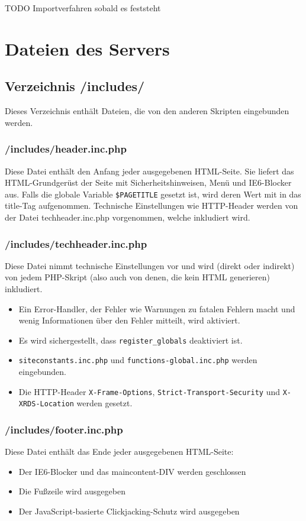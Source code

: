 TODO Importverfahren sobald es feststeht

\newpage
\section{Dateien des Servers}

\subsection{Verzeichnis /includes/}
Dieses Verzeichnis enthält Dateien, die von den anderen Skripten eingebunden werden.

\subsubsection{/includes/header.inc.php}
Diese Datei enthält den Anfang jeder ausgegebenen HTML-Seite.
Sie liefert das HTML-Grundgerüst der Seite mit Sicherheitshinweisen, Menü und IE6-Blocker aus.
Falls die globale Variable \texttt{\$PAGETITLE} gesetzt ist, wird deren Wert mit in das title-Tag aufgenommen.
Technische Einstellungen wie HTTP-Header werden von der Datei techheader.inc.php vorgenommen, welche inkludiert wird.


\subsubsection{/includes/techheader.inc.php}
Diese Datei nimmt technische Einstellungen vor und wird (direkt oder indirekt) von jedem PHP-Skript (also auch von denen, die kein HTML generieren) inkludiert.

\begin{itemize}
	\item Ein Error-Handler, der Fehler wie Warnungen zu fatalen Fehlern macht und wenig Informationen über den Fehler mitteilt, wird aktiviert.
	\item Es wird sichergestellt, dass \texttt{register\_globals} deaktiviert ist.
	\item \texttt{siteconstants.inc.php} und \texttt{functions-global.inc.php} werden eingebunden.
	\item Die HTTP-Header \texttt{X-Frame-Options}, \texttt{Strict-Transport-Security} und \texttt{X-XRDS-Location} werden gesetzt.
\end{itemize}

\subsubsection{/includes/footer.inc.php}
Diese Datei enthält das Ende jeder ausgegebenen HTML-Seite:
\begin{itemize}
	\item Der IE6-Blocker und das maincontent-DIV werden geschlossen
	\item Die Fußzeile wird ausgegeben
	\item Der JavaScript-basierte Clickjacking-Schutz wird ausgegeben
\end{itemize}

